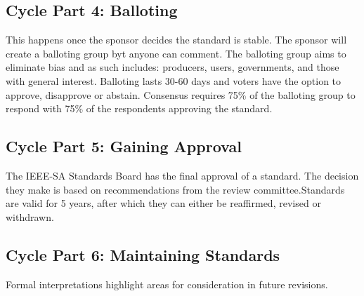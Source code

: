 \subsection{Cycle Part 4: Balloting}
This happens once the sponsor decides the standard is stable. The sponsor will create a balloting group byt anyone can comment. The balloting group aims to eliminate bias and as such includes: producers, users, governments, and those with general interest. Balloting lasts 30-60 days and voters have the option to approve, disapprove or abstain. Consensus requires 75\% of the balloting group to respond with 75\% of the respondents approving the standard.
\subsection{Cycle Part 5: Gaining Approval}
The IEEE-SA Standards Board has the final approval of a standard. The decision they make is based on recommendations from the review committee.Standards are valid for 5 years, after which they can either be reaffirmed, revised or withdrawn. 
\subsection{Cycle Part 6: Maintaining Standards}
Formal interpretations highlight areas for consideration in future revisions. 